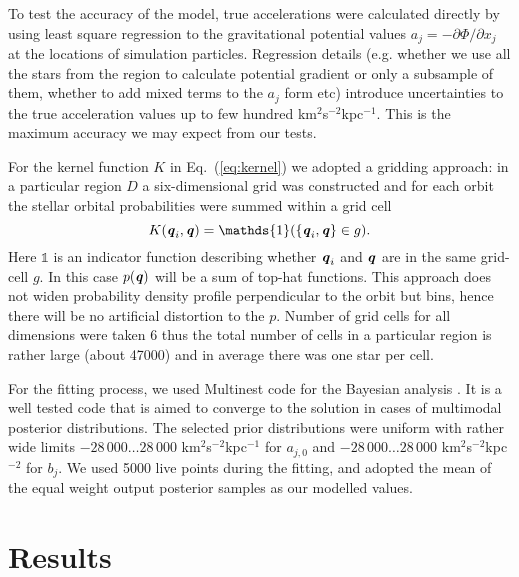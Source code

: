 \documentclass[fleqn,usenatbib]{mnras}
\begin{document}
To test the accuracy of the model, true accelerations were calculated directly by using least square regression to the gravitational potential values $a_j = -\partial\Phi/\partial x_j$ at the locations of simulation particles. Regression details (e.g. whether we use all the stars from the region to calculate potential gradient or only a subsample of them, whether to add mixed terms to the $a_j$ form etc) introduce uncertainties to the true acceleration values up to few hundred km$^2$s$^{-2}$kpc$^{-1}$. This is the maximum accuracy we may expect from our tests. 

For the kernel function $K$ in Eq.~(\ref{eq:kernel}) we adopted a gridding approach: in a particular region $D$ a six-dimensional grid was constructed and for each orbit the stellar orbital probabilities were summed within a grid cell 
\begin{equation}
	K ( \textbf{\textit{q}}_i, \textbf{\textit{q}} ) = \mathds{1}(\{\textbf{\textit{q}}_i, \textbf{\textit{q}} \} \in g).
\end{equation}
Here $\mathds{1}$ is an indicator function describing whether $\textbf{\textit{q}}_i$ and $\textbf{\textit{q}}$ are in the same grid-cell $g$. In this case $p( \textbf{\textit{q}} )$ will be a sum of top-hat functions. This approach does not widen probability density profile perpendicular to the orbit but bins, hence there will be no artificial distortion to the $p$. Number of grid cells for all dimensions were taken $6$ thus the total number of cells in a particular region is rather large (about 47000) and in average there was one star per cell. 

For the fitting process, we used Multinest code for the Bayesian analysis \citep{MN1, MN2,MN3}. It is a well tested code that is aimed to converge to the solution in cases of multimodal posterior distributions. The selected prior distributions were uniform with rather wide limits $-28\,000\dots28\,000$ km$^2$s$^{-2}$kpc$^{-1}$ for $a_{j,0}$ and $-28\,000\dots28\,000$ km$^2$s$^{-2}$kpc$^{-2}$ for $b_{j}$. We used 5000 live points during the fitting, and adopted the mean of the equal weight output posterior samples as our modelled values. 


\section{Results} 
\label{sec:results}
\end{document}

